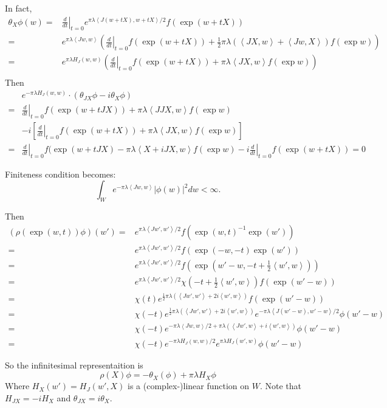 \documentclass[12pt]{article}
\def\inn#1#2{\left\langle{#1},{#2}\right\rangle}
\def\abs#1{\left|{#1}\right|}
\def\ddt{\left.\frac{d}{dt}\right|_{t=0}}
\begin{document}
In fact, 
\[
\begin{split}
\theta_X \phi(w) =& \ddt e^{\pi \lambda \inn{J(w+tX)}{w+tX}/2} f(\exp(w+tX))\\
= &  e^{\pi \lambda \inn{Jw}{w}}(\ddt f(\exp(w+tX)) 
+ \frac{1}{2}\pi\lambda (\inn{JX}{w}+\inn{Jw}{X}) f(\exp w )) \\
= &  e^{\pi \lambda H_J(w,w)}(\ddt f(\exp(w+tX)) + \pi\lambda \inn{JX}{w} 
f(\exp w)) \\
\end{split}
\] 
Then 
\[
\begin{split}
& e^{-\pi \lambda H_J(w,w)}\cdot (\theta_{JX}\phi - i\theta_{X}\phi) \\
= & \ddt f(\exp(w+tJX)) + \pi\lambda \inn{JJX}{w} f(\exp w)\\
&-i \left[ \ddt f(\exp(w+tX)) + \pi\lambda \inn{JX}{w} f(\exp w)\right]\\
=& \ddt f(\exp(w+tJX)  - \pi \lambda \inn{X+iJX}{w} f(\exp w)
- i \ddt f(\exp(w+tX))= 0 
\end{split}
\]

Finiteness condition becomes:
\[
\int_W e^{-\pi \lambda \inn{Jw}{w}}\abs{\phi(w)}^2dw < \infty.
\]

Then
\[
\begin{split}
(\rho(\exp(w,t))\phi)(w') 
=& e^{\pi \lambda \inn{Jw'}{w'}/2} f(\exp(w,t)^{-1}\exp(w'))\\
=& e^{\pi \lambda \inn{Jw'}{w'}/2} f(\exp(-w,-t)\exp(w'))\\
=& e^{\pi \lambda \inn{Jw'}{w'}/2} f(\exp(w'-w,-t+\frac{1}{2}\inn{w'}{w}))\\
=& e^{\pi \lambda \inn{Jw'}{w'}/2} \chi(-t+ \frac{1}{2}\inn{w'}{w}) f(\exp(w'-w))\\
=& \chi(t) e^{\frac{1}{2}\pi \lambda (\inn{Jw'}{w'}+2i \inn{w'}{w})}
 f(\exp(w'-w)) \\
=& \chi(-t) e^{\frac{1}{2}\pi \lambda (\inn{Jw'}{w'}+2i \inn{w'}{w})} 
e^{-\pi \lambda \inn{J(w'-w)}{w'-w}/2} \phi(w'-w)\\
=& \chi(-t) e^{-\pi \lambda \inn{Jw}{w}/2+ \pi\lambda (\inn{Jw'}{w}+i\inn{w'}{w})} 
 \phi(w'-w) \\
=& \chi(-t) e^{-\pi\lambda H_J(w,w)/2} e^{\pi\lambda H_J(w',w)} \phi(w'-w)
\end{split}
\]


So the infinitesimal representaition is 
\[
\rho(X) \phi = -\theta_X(\phi) +\pi\lambda H_X \phi
\]
Where $H_X(w') = H_J(w',X)$ is a (complex-)linear function on $W$.
Note that $H_{JX} = -i H_X$ and $\theta_{JX} = i\theta_X$.
\end{document}
